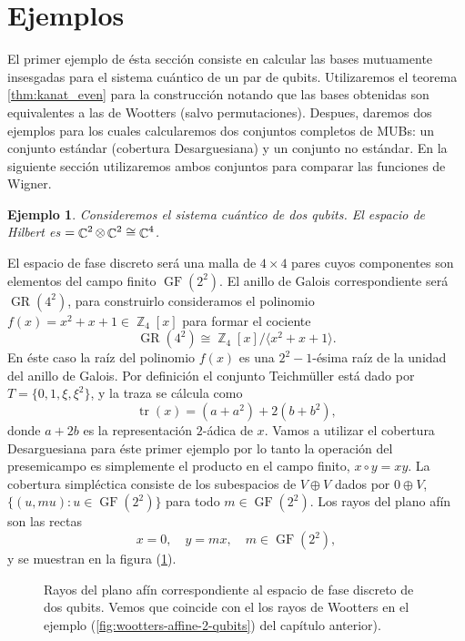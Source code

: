 \documentclass[a4paper]{report}
\DeclareMathOperator{\C}{\mathbb{C}}
\DeclareMathOperator{\Z}{\mathbb{Z}}
\let\H\relax
\DeclareMathOperator{\H}{\mathcal H}
\DeclareMathOperator{\tr}{tr}
\DeclareMathOperator{\GF}{GF}
\DeclareMathOperator{\GR}{GR}
\newtheorem{example}{Ejemplo}
\begin{document}
  \section{Ejemplos}

  El primer ejemplo de ésta sección consiste en calcular las
  bases mutuamente insesgadas para el sistema cuántico de un
  par de qubits. Utilizaremos el teorema
  \ref{thm:kanat_even} para la construcción notando que las
  bases obtenidas son equivalentes a las de Wootters (salvo
  permutaciones).  Despues, daremos dos ejemplos para los
  cuales calcularemos dos conjuntos completos de MUBs: un
  conjunto estándar (cobertura Desarguesiana) y un conjunto
  no estándar. En la siguiente sección utilizaremos ambos
  conjuntos para comparar las funciones de Wigner.

  \begin{example}
    Consideremos el sistema cuántico de dos qubits. El
    espacio de Hilbert es $\H = \C^2 \otimes \C^2 \cong
    \C^{4}$. 
  \end{example}
  El espacio de fase discreto será una malla de
  $4 \times 4$ pares cuyos componentes son elementos del
  campo finito $\GF(2^2)$. El anillo de Galois
  correspondiente será $\GR(4^{2})$, para construirlo
  consideramos el polinomio $f(x) = x^2+x+1 \in \Z_4[x]$
  para formar el cociente
  \[
    \GR(4^2) \cong \Z_4[x] / \langle x^2+x+1 \rangle.
  \] 
  En éste caso la raíz del polinomio $f(x)$ es una
  $2^{2}-1$-ésima raíz de la unidad del anillo de Galois.
  Por definición el conjunto Teichmüller está dado por $T =
  \{0,1,\xi,\xi^2\}$, y la traza se cálcula como
  \[
    \tr(x) = (a + a^2) + 2(b + b^2),
  \] 
  donde $a + 2b$ es la representación $2$-ádica de $x$.
  Vamos a utilizar el cobertura Desarguesiana para éste
  primer ejemplo por lo tanto la operación del presemicampo
  es simplemente el producto en el campo finito, $x \circ y
  = xy$. La cobertura simpléctica consiste de los
  subespacios de $V \oplus V$ dados por $0 \oplus V$, $\{(u,
  mu) : u \in \GF(2^2)\}$ para todo $m \in \GF(2^2)$.  Los
  rayos del plano afín son las rectas
  \[
    x = 0,
    \quad
    y = mx, \quad m \in \GF(2^2),
  \] 
  y se muestran en la figura (\ref{fig:2-2-desargues-plane}).
  \begin{figure}[ht]
    \centering
    \scalebox{0.8}{
      
    }
    \caption{Rayos del plano afín correspondiente al espacio
    de fase discreto de dos qubits. Vemos que coincide con
    el los rayos de Wootters en el ejemplo
    (\ref{fig:wootters-affine-2-qubits}) del capítulo
    anterior).}
    \label{fig:2-2-desargues-plane}
  \end{figure}
\end{document}

